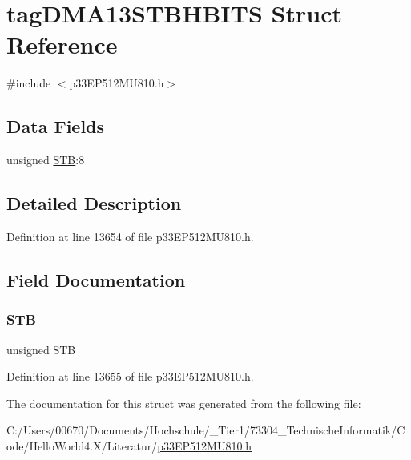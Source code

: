 \hypertarget{structtag_d_m_a13_s_t_b_h_b_i_t_s}{}\section{tag\+D\+M\+A13\+S\+T\+B\+H\+B\+I\+TS Struct Reference}
\label{structtag_d_m_a13_s_t_b_h_b_i_t_s}


{\ttfamily \#include $<$p33\+E\+P512\+M\+U810.\+h$>$}

\subsection*{Data Fields}
\begin{DoxyCompactItemize}
\item 
unsigned \hyperlink{structtag_d_m_a13_s_t_b_h_b_i_t_s_a9bd043a4db27e09b5035a563a8758fe7}{S\+TB}\+:8
\end{DoxyCompactItemize}


\subsection{Detailed Description}


Definition at line 13654 of file p33\+E\+P512\+M\+U810.\+h.



\subsection{Field Documentation}
\mbox{\label{structtag_d_m_a13_s_t_b_h_b_i_t_s_a9bd043a4db27e09b5035a563a8758fe7}} 
\subsubsection{\texorpdfstring{S\+TB}{STB}}
{\footnotesize\ttfamily unsigned S\+TB}



Definition at line 13655 of file p33\+E\+P512\+M\+U810.\+h.



The documentation for this struct was generated from the following file\+:\begin{DoxyCompactItemize}
\item 
C\+:/\+Users/00670/\+Documents/\+Hochschule/\+\_\+\+Tier1/73304\+\_\+\+Technische\+Informatik/\+Code/\+Hello\+World4.\+X/\+Literatur/\hyperlink{p33_e_p512_m_u810_8h}{p33\+E\+P512\+M\+U810.\+h}\end{DoxyCompactItemize}
